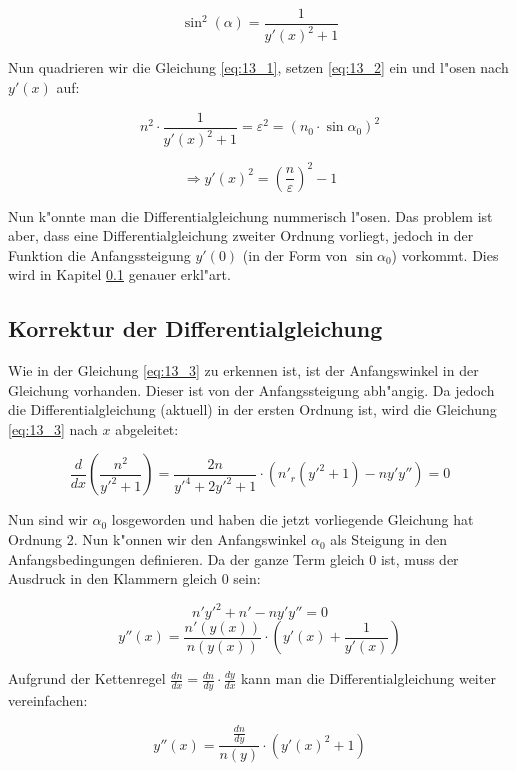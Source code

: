 \begin{equation} \label{eq:13_2}
\sin^2 (\alpha) = \frac{1}{y'(x)^2 + 1}
\end{equation}

Nun quadrieren wir die Gleichung \ref{eq:13_1}, setzen \ref{eq:13_2} ein und l"osen nach $y'(x)$ auf:

\begin{equation} \label{eq:13_3}
n^2 \cdot \frac{1}{y'(x)^2 + 1} = \varepsilon^2 = (n_0 \cdot \sin \alpha_0)^2
\end{equation}

\begin{equation} \label{eq:13_4}
\Rightarrow y'(x)^2 = \left( \frac{n}{\varepsilon} \right)^2 - 1
\end{equation}

Nun k"onnte man die Differentialgleichung nummerisch l"osen. 
Das problem ist aber, dass eine Differentialgleichung zweiter Ordnung vorliegt, jedoch in der Funktion die Anfangssteigung $y'(0)$ (in der Form von $\sin \alpha_0$) vorkommt. 
Dies wird in Kapitel \ref{ch:korrektur} genauer erkl"art.

\subsection{Korrektur der Differentialgleichung} \label{ch:korrektur}

Wie in der Gleichung \ref{eq:13_3} zu erkennen ist, ist der Anfangswinkel in der Gleichung vorhanden. 
Dieser ist von der Anfangssteigung abh"angig. 
Da jedoch die Differentialgleichung (aktuell) in der ersten Ordnung ist, wird die Gleichung \ref{eq:13_3} nach $x$ abgeleitet:

$$\frac{d}{dx} \left( \frac{n^2}{y'^2 + 1} \right) = \frac{2n}{y'^4 + 2y'^2 + 1} \cdot \left( n'_r(y'^2 + 1) - n y' y'' \right) = 0$$

Nun sind wir $\alpha_0$ losgeworden und haben die jetzt vorliegende Gleichung hat Ordnung 2. 
Nun k"onnen wir den Anfangswinkel $\alpha_0$ als Steigung in den Anfangsbedingungen definieren. 
Da der ganze Term gleich 0 ist, muss der Ausdruck in den Klammern gleich 0 sein:

$$n'y'^2 + n' - n y' y'' = 0$$
$$y''(x) = \frac{n'(y(x))}{n(y(x))} \cdot \left( y'(x) + \frac{1}{y'(x)} \right)$$

Aufgrund der Kettenregel $\frac{dn}{dx} = \frac{dn}{dy} \cdot \frac{dy}{dx}$ kann man die Differentialgleichung weiter vereinfachen:

\begin{equation} \label{eq:planar_DGL}
y''(x) = \frac{\frac{dn}{dy}}{n(y)} \cdot \left( y'(x)^2 + 1\right)
\end{equation}

